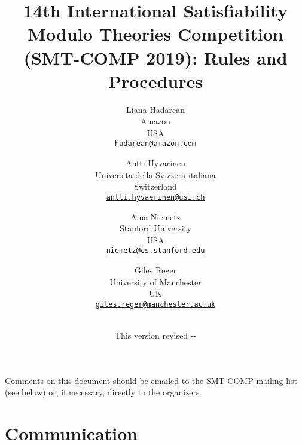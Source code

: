\documentclass[12pt]{article}
\begin{document}
\date{\small This version revised \the\year-\the\month-\the\day}

\title{14th International Satisfiability Modulo Theories Competition
  (SMT-COMP 2019): Rules and Procedures}

\def\doauthor#1{{%
  \hsize.5\hsize \advance\hsize by-1cm %
  \def\\{\hss\egroup\hbox to\hsize\bgroup\strut\hss}%
  \vbox{\hbox to\hsize\bgroup\strut\hss#1\hss\egroup}}}%

\def\header#1{\medskip\noindent\textbf{#1}}

\author{%
Liana Hadarean \\
Amazon \\
USA \\
{\small\href{mailto:hadarean@amazon.com}{\texttt{hadarean@amazon.com}}}\\
\and
Antti Hyvarinen \\
Universita della Svizzera italiana \\
Switzerland \\
{\small\href{mailto:antti.hyvaerinen@usi.ch}{\texttt{antti.hyvaerinen@usi.ch}}} \\
\and
Aina Niemetz \\
Stanford University\\
USA\\
{\small\href{mailto:niemetz@cs.stanford.edu}{\texttt{niemetz@cs.stanford.edu}}}\\
\and
Giles Reger \\
University of Manchester \\
UK \\
{\small\href{mailto:giles.reger@manchester.ac.uk}{\texttt{giles.reger@manchester.ac.uk}}} \\
\\
}

\maketitle

\noindent Comments on this document should be emailed to the SMT-COMP
mailing list (see below) or, if necessary, directly to the organizers.


\section{Communication}
\end{document}
